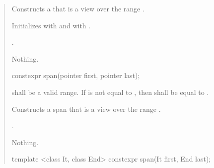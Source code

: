 \documentclass{wg21}
\begin{document}
\begin{quote}
\begin{itemdescr}
    \pnum
    \effects
    \begin{removedblock}
    Constructs a  that is a view over the range .
    \end{removedblock}
	\begin{addedblock}
    Initializes  with  and  with .
    \end{addedblock}
    \pnum
    \begin{removedblock}
    \ensures
    .
    \end{removedblock}	
    		

    \pnum
    \throws
    Nothing.

\end{itemdescr}


\begin{removedblock}
\begin{itemdecl}
constexpr span(pointer first, pointer last);
\end{itemdecl}
\end{removedblock}
\begin{removedblock}

\begin{itemdescr}
    \pnum
    \requires
     shall be a valid range.
    If  is not equal to ,
    then  shall be equal to .

    \pnum
    \effects
    Constructs a span that is a view over the range .

    \pnum
    \ensures
    .

    \pnum
    \throws
    Nothing.
\end{itemdescr}
\end{removedblock}

\begin{addedblock}
\begin{itemdecl}
template <class It, class End>
constexpr span(It first, End last);
\end{itemdecl}
\end{addedblock}

\begin{addedblock}


\end{addedblock}
\end{quote}
\end{document}
